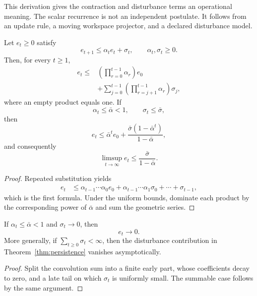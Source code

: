 This derivation gives the contraction and disturbance terms an operational
meaning. The scalar recurrence is not an independent postulate. It follows
from an update rule, a moving workspace projector, and a declared disturbance
model.


\begin{theorem}\label{thm:persistence}
Let \(e_t\geq0\) satisfy
\[
e_{t+1}\leq\alpha_te_t+\sigma_t,
\qquad
\alpha_t,\sigma_t\geq0.
\]
Then, for every \(t\geq1\),
\[
\boxed{
\begin{aligned}
e_t
\leq
&\left(\prod_{r=0}^{t-1}\alpha_r\right)e_0\\
&+
\sum_{j=0}^{t-1}
\left(\prod_{r=j+1}^{t-1}\alpha_r\right)\sigma_j,
\end{aligned}
}
\]
where an empty product equals one. If
\[
\alpha_t\leq\bar\alpha<1,
\qquad
\sigma_t\leq\bar\sigma,
\]
then
\[
\boxed{
e_t
\leq
\bar\alpha^te_0
+
\frac{\bar\sigma(1-\bar\alpha^t)}{1-\bar\alpha},
}
\]
and consequently
\[
\boxed{
\limsup_{t\to\infty}e_t
\leq
\frac{\bar\sigma}{1-\bar\alpha}.
}
\]
\end{theorem}

\begin{proof}
Repeated substitution yields
\[
\begin{aligned}
e_t
&\leq
\alpha_{t-1}\cdots\alpha_0e_0
+
\alpha_{t-1}\cdots\alpha_1\sigma_0
+
\cdots
+
\sigma_{t-1},
\end{aligned}
\]
which is the first formula. Under the uniform bounds, dominate each product by
the corresponding power of \(\bar\alpha\) and sum the geometric series.
\end{proof}

\begin{corollary}\label{cor:vanishing-disturbance}
If \(\alpha_t\leq\bar\alpha<1\) and \(\sigma_t\to0\), then
\[
e_t\to0.
\]
More generally, if \(\sum_{t\geq0}\sigma_t<\infty\), then the disturbance
contribution in Theorem~\ref{thm:persistence} vanishes asymptotically.
\end{corollary}

\begin{proof}
Split the convolution sum into a finite early part, whose coefficients decay
to zero, and a late tail on which \(\sigma_t\) is uniformly small. The
summable case follows by the same argument.
\end{proof}

